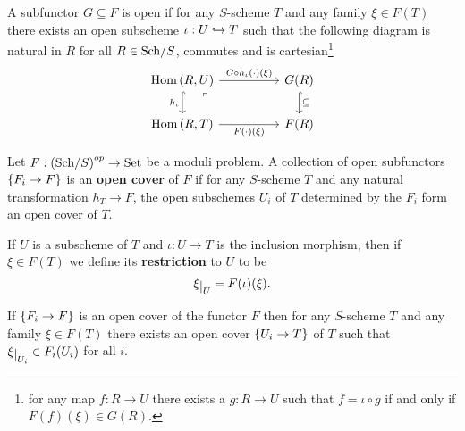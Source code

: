 \begin{definition}
A subfunctor $G\subseteq F$ is open if for any $S$-scheme $T$ and any family $\xi\in F(T)$ there exists an open subscheme $\iota:U\hookrightarrow T$ such that the following diagram is natural in $R$ for all $R\in {\mathrm{Sch}}/{S}$, commutes and is cartesian\footnote{for any map $f:R\to U$ there exists a $g:R\to U$ such that $f=\iota\circ g$ if and only if $F(f)(\xi)\in G(R)$.}
\[\begin{tikzcd}
	{\Hom(R,U)} && {G(R)} \\
	{\Hom(R,T)} && {F(R)}
	\arrow["{G\circ h_\iota(\cdot)(\xi)}", from=1-1, to=1-3]
	\arrow["h_\iota"', hook, from=1-1, to=2-1]
	\arrow["\subseteq", hook, from=1-3, to=2-3]
	\arrow[""{name=0, anchor=center, inner sep=0}, "{F(\cdot)(\xi)}"', from=2-1, to=2-3]
	\arrow["\ulcorner"{anchor=center, pos=0.125}, draw=none, from=1-1, to=0]
\end{tikzcd}\]
\end{definition}

\begin{definition}
Let $F:\left({\mathrm{Sch}}/{S}\right)^{op}\to \mathrm{Set}$ be a moduli problem. A collection of open subfunctors $\left\{{F_i\to F}\right\}$ is an \textbf{open cover} of $F$ if for any $S$-scheme $T$ and any natural transformation $h_T\to F$, the open subschemes $U_i$ of $T$ determined by the $F_i$ form an open cover of $T$.
\end{definition}



\begin{definition}
If $U$ is a subscheme of $T$ and $\iota:U\to T$ is the inclusion morphism, then if $\xi\in F(T)$ we define its \textbf{restriction} to $U$ to be
\[\xi\res U=F(\iota)(\xi).\]
\end{definition}

\begin{remark}
If $\left\{{F_i\to F}\right\}$ is an open cover of the functor $F$ then for any $S$-scheme $T$ and any family $\xi\in F(T)$ there exists an open cover $\left\{{U_i\to T}\right\}$ of $T$ such that $\xi\res{U_i}\in F_i(U_i)$ for all $i$.
\end{remark}

